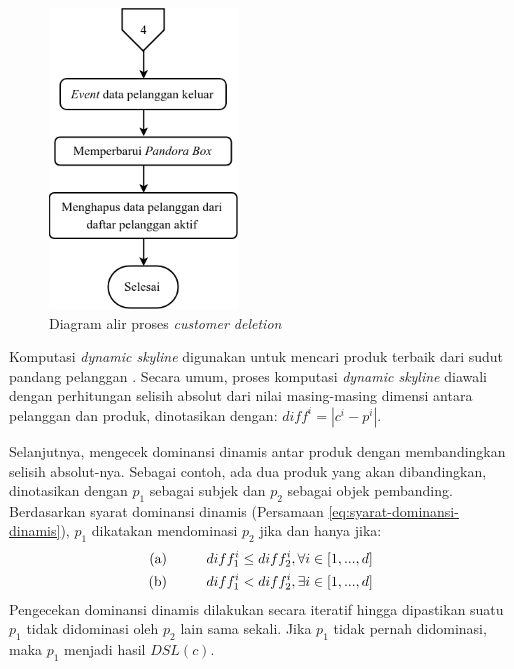 \begin{figure}[H]
	\centering
	\includegraphics[width=5cm]{assets/img/bab3/flowchart-co.png}
	\caption{Diagram alir proses \textit{customer deletion}}
	\label{fig:flowchart-co}
\end{figure}


Komputasi \textit{dynamic skyline} digunakan untuk mencari produk terbaik dari sudut pandang pelanggan \cite{kmpp}. Secara umum, proses komputasi \textit{dynamic skyline} diawali dengan perhitungan selisih absolut dari nilai masing-masing dimensi antara pelanggan dan produk, dinotasikan dengan: $diff^i = |c^i - p^i|$.

Selanjutnya, mengecek dominansi dinamis antar produk dengan membandingkan selisih absolut-nya. Sebagai contoh, ada dua produk yang akan dibandingkan, dinotasikan dengan $p_1$ sebagai subjek dan $p_2$ sebagai objek pembanding. Berdasarkan syarat dominansi dinamis (Persamaan \ref{eq:syarat-dominansi-dinamis}), $p_1$ dikatakan mendominasi $p_2$ jika dan hanya jika:
\begin{equation}\label{eq:komputasi-dsl}
\begin{split}
\text{(a)} \hspace*{1cm} diff_1^i \leq diff_2^i, \forall i \in [1, ..., d] \\
\text{(b)} \hspace*{1cm} diff_1^i < diff_2^i, \exists i \in [1, ..., d]
\end{split}
\end{equation}
Pengecekan dominansi dinamis dilakukan secara iteratif hingga dipastikan suatu $p_1$ tidak didominasi oleh $p_2$ lain sama sekali. Jika $p_1$ tidak pernah didominasi, maka $p_1$ menjadi hasil $DSL(c)$.

